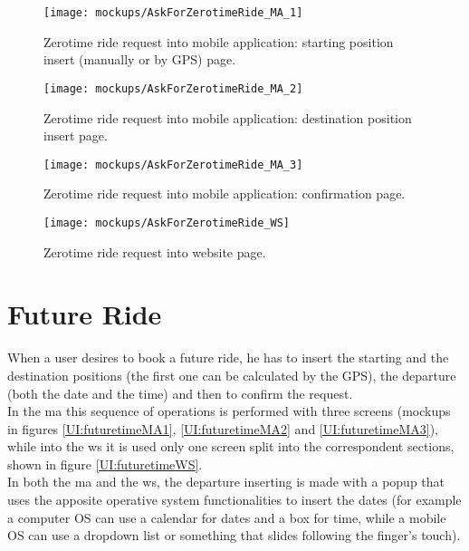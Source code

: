 \documentclass[\mainpath/main]{subfiles}
\begin{document}
\begin{figure}[ht!]
	\centering
	\begin{minipage}[t]{0.4\textwidth}
		\centering
		\texttt{[image: mockups/AskForZerotimeRide\_MA\_1]}
		\caption[Zerotime ride request part1 into mobile application.]{Zerotime ride request into mobile application: starting position insert (manually or by GPS) page.}
		\label{UI:zerotimeMA1}
	\end{minipage}
	\hspace{1 cm}
	\begin{minipage}[t]{0.40\linewidth}
		\centering
		\texttt{[image: mockups/AskForZerotimeRide\_MA\_2]}
		\caption[Zerotime ride request part2 into mobile application.]{Zerotime ride request into mobile application: destination position insert page.}
		\label{UI:zerotimeMA2}
	\end{minipage}
\end{figure}

\begin{figure}[ht!]
	\centering
	\begin{minipage}[t]{0.4\textwidth}
		\centering
		\texttt{[image: mockups/AskForZerotimeRide\_MA\_3]}
		\caption[Zerotime ride request part3 into mobile application.]{Zerotime ride request into mobile application: confirmation page.}
		\label{UI:zerotimeMA3}
	\end{minipage}
	\hspace{1 cm}
	\begin{minipage}[t]{0.40\linewidth}
		\centering
		\texttt{[image: mockups/AskForZerotimeRide\_WS]}
		\caption[Zerotime ride request into website.]{Zerotime ride request into website page.}
		\label{UI:zerotimeWS}
	\end{minipage}
\end{figure}

\clearpage

\section{Future Ride}
When a user desires to book a future ride, he has to insert the starting and the destination positions (the first one can be calculated by the GPS), the departure (both the date and the time) and then to confirm the request.\\
In the \gls{ma} this sequence of operations is performed with three screens (mockups in figures \ref{UI:futuretimeMA1}, \ref{UI:futuretimeMA2} and \ref{UI:futuretimeMA3}), while into the \gls{ws} it is used only one screen split into the correspondent sections, shown in figure \ref{UI:futuretimeWS}.\\
In both the \gls{ma} and the \gls{ws}, the departure inserting is made with a popup that uses the apposite operative system functionalities to insert the dates (for example a computer OS can use a calendar for dates and a box for time, while a mobile OS can use a dropdown list or something that slides following the finger's touch).\\
\end{document}

